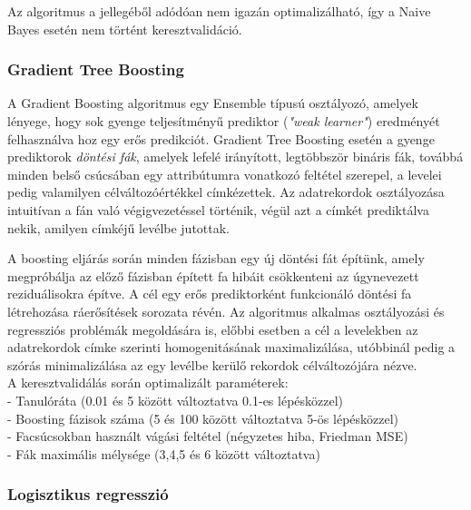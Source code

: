 \documentclass[12pt]{article}
\begin{document}
Az algoritmus a jellegéből adódóan nem igazán optimalizálható, így a Naive Bayes esetén nem történt keresztvalidáció.

\subsubsection{Gradient Tree Boosting}

A Gradient Boosting algoritmus egy Ensemble típusú osztályozó, amelyek lényege, hogy sok gyenge teljesítményű prediktor (\textit{"weak learner"}) eredményét felhasználva hoz egy erős predikciót. Gradient Tree Boosting esetén a gyenge prediktorok \textit{döntési fák}, amelyek lefelé irányított, legtöbbször bináris fák, továbbá minden belső csúcsában egy attribútumra vonatkozó feltétel szerepel, a levelei pedig valamilyen célváltozóértékkel címkézettek. Az adatrekordok osztályozása intuitívan a fán való végigvezetéssel történik, végül azt a címkét prediktálva nekik, amilyen címkéjű levélbe jutottak.

A boosting eljárás során minden fázisban egy új döntési fát építünk, amely megpróbálja az előző fázisban épített fa hibáit csökkenteni az úgynevezett reziduálisokra építve. A cél egy erős prediktorként funkcionáló döntési fa létrehozása ráerősítések sorozata révén. Az algoritmus alkalmas osztályozási és regressziós problémák megoldására is, előbbi esetben a cél a levelekben az adatrekordok címke szerinti homogenitásának maximalizálása, utóbbinál pedig a szórás minimalizálása az egy levélbe kerülő rekordok célváltozójára nézve. \\



\noindent A keresztvalidálás során optimalizált paraméterek: \\
- Tanulóráta (0.01 és 5 között változtatva 0.1-es lépésközzel)\\
- Boosting fázisok száma (5 és 100 között változtatva 5-ös lépésközzel)\\
- Facsúcsokban használt vágási feltétel (négyzetes hiba, Friedman MSE) \\
- Fák maximális mélysége (3,4,5 és 6 között változtatva) \\

\subsubsection{Logisztikus regresszió}
\end{document}

